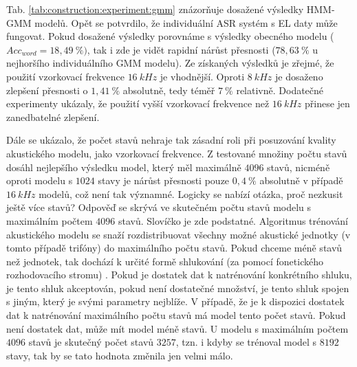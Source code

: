 
Tab. \ref{tab:construction:experiment:gmm} znázorňuje dosažené výsledky HMM-GMM modelů. Opět se potvrdilo, že individuální ASR systém s EL daty může fungovat. Pokud dosažené výsledky porovnáme s výsledky obecného modelu ($Acc_{word} = 18,49\ \%)$, tak i zde je vidět rapidní nárůst přesnosti ($78,63\ \%$ u nejhoršího individuálního GMM modelu). Ze získaných výsledků je zřejmé, že použití vzorkovací frekvence $16\ kHz$ je vhodnější. Oproti $8\ kHz$ je dosaženo zlepšení přesnosti o $1,41\ \%$ absolutně, tedy téměř $7\ \%$ relativně. Dodatečné experimenty ukázaly, že použití vyšší vzorkovací frekvence než $16\ kHz$ přinese jen zanedbatelné zlepšení.

Dále se ukázalo, že počet stavů nehraje tak zásadní roli při posuzování kvality akustického modelu, jako vzorkovací frekvence. Z testované množiny počtu stavů dosáhl nejlepšího výsledku model, který měl maximálně $4096$ stavů, nicméně oproti modelu s $1024$ stavy je nárůst přesnosti pouze $0,4\ \%$ absolutně v případě $16\ kHz$ modelů, což není tak významné. Logicky se nabízí otázka, proč nezkusit ještě více stavů? Odpověď se skrývá ve skutečném počtu stavů modelu s maximálním počtem $4096$ stavů. Slovíčko  je zde podstatné. Algoritmus trénování akustického modelu se snaží rozdistribuovat všechny možné akustické jednotky (v tomto případě trifóny) do maximálního počtu stavů. Pokud chceme méně stavů než jednotek, tak dochází k určité formě shlukování (za pomocí fonetického rozhodovacího stromu) \cite{Holmes2001}. Pokud je dostatek dat k natrénování konkrétního shluku, je tento shluk akceptován, pokud není dostatečné množství, je tento shluk spojen s jiným, který je svými parametry nejblíže. V případě, že je k dispozici dostatek dat k natrénování maximálního počtu stavů má model tento počet stavů. Pokud není dostatek dat, může mít model méně stavů. U modelu s maximálním počtem $4096$ stavů je skutečný počet stavů $3257$, tzn. i kdyby se trénoval model s $8192$ stavy, tak by se tato hodnota změnila jen velmi málo.

